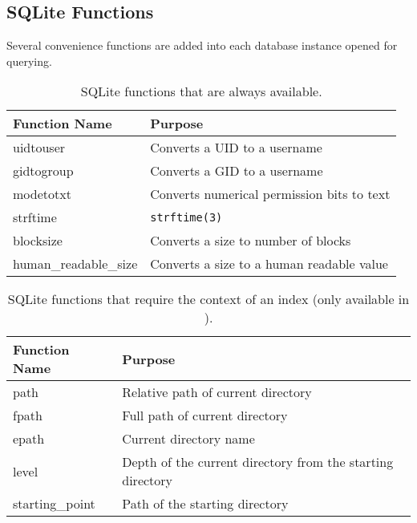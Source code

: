 \clearpage
\subsection{SQLite Functions}
Several convenience functions are added into each database instance
opened for querying.

\begin{table}[htb]
  \centering
  \begin{tabular}{| l | l |}
    \hline
    Function Name & Purpose \\
    \hline
    uidtouser & Converts a UID to a username \\
    \hline
    gidtogroup & Converts a GID to a username \\
    \hline
    modetotxt & Converts numerical permission bits to text \\
    \hline
    strftime & \texttt{strftime(3)} \\
    \hline
    blocksize & Converts a size to number of blocks \\
    \hline
    human\_readable\_size & Converts a size to a human readable value \\
    \hline
  \end{tabular}
  \caption{SQLite functions that are always available.}
\end{table}

\begin{table}[htb]
  \centering
  \begin{tabular}{| l | l |}
    \hline
    Function Name & Purpose \\
    \hline
    path & Relative path of current directory \\
    \hline
    fpath & Full path of current directory \\
    \hline
    epath & Current directory name \\
    \hline
    level & Depth of the current directory from the starting directory \\
    \hline
    starting\_point & Path of the starting directory \\
    \hline
  \end{tabular}
  \caption{SQLite functions that require the context of an index (only
    available in \gufiquery).}
\end{table}
\clearpage
